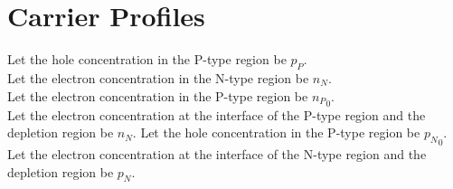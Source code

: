\documentclass[titlepage, fleqn, a4paper, 12pt, twoside]{article}
\theoremstyle{definition}
\theoremstyle{theorem}
\begin{document}
\section{Carrier Profiles}

Let the hole concentration in the P-type region be $p_P$.\\
Let the electron concentration in the N-type region be $n_N$.\\
Let the electron concentration in the P-type region be ${n_P}_0$.\\
Let the electron concentration at the interface of the P-type region and the depletion region be $n_N$.
Let the hole concentration in the P-type region be ${p_N}_0$.\\
Let the electron concentration at the interface of the N-type region and the depletion region be $p_N$.\\
\end{document}
